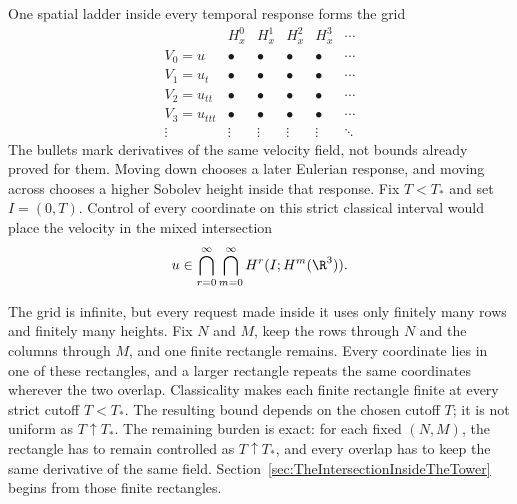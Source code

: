 One spatial ladder inside every temporal response forms the grid
{\small
\[
\begin{array}{c|ccccc}
 & H^0_x & H^1_x & H^2_x & H^3_x & \cdots\\
\hline
V_0=u      & \bullet & \bullet & \bullet & \bullet & \cdots\\
V_1=u_t    & \bullet & \bullet & \bullet & \bullet & \cdots\\
V_2=u_{tt} & \bullet & \bullet & \bullet & \bullet & \cdots\\
V_3=u_{ttt}& \bullet & \bullet & \bullet & \bullet & \cdots\\
\vdots     & \vdots  & \vdots  & \vdots  & \vdots  & \ddots
\end{array}
\]
}
The bullets mark derivatives of the same velocity field, not bounds already proved for them.
Moving down chooses a later Eulerian response, and moving across chooses a higher Sobolev height inside that response.
Fix \(T<T_*\) and set \(I=(0,T)\).
Control of every coordinate on this strict classical interval would place the velocity in the mixed intersection
\begin{equation}\label{eq:BodyDesiredMixedIntersection}
  u\in
  \bigcap_{r=0}^{\infty}
  \bigcap_{m=0}^{\infty}
  H^r(I;H^m(\R^3)).
\end{equation}

The grid is infinite, but every request made inside it uses only finitely many rows and finitely many heights.
Fix \(N\) and \(M\), keep the rows through \(N\) and the columns through \(M\), and one finite rectangle remains.
Every coordinate lies in one of these rectangles, and a larger rectangle repeats the same coordinates wherever the two overlap.
Classicality makes each finite rectangle finite at every strict cutoff \(T<T_*\).
The resulting bound depends on the chosen cutoff \(T\); it is not uniform as \(T\uparrow T_*\).
The remaining burden is exact: for each fixed \((N,M)\), the rectangle has to remain controlled as \(T\uparrow T_*\), and every overlap has to keep the same derivative of the same field.
Section~\ref{sec:TheIntersectionInsideTheTower} begins from those finite rectangles.
